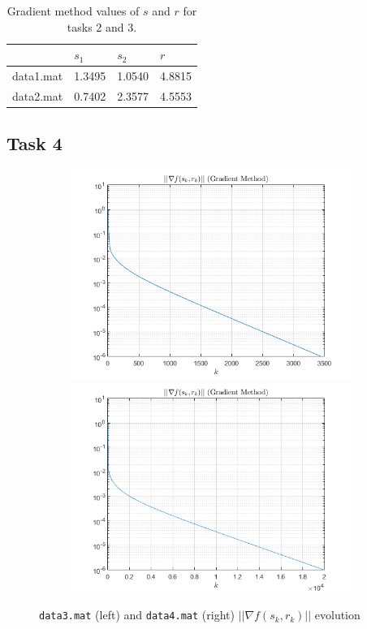 \begin{table}[H]
\centering
\begin{tabular}{l|lll}
 & $s_1$ & $s_2$ & $r$ \\ \hline
data1.mat & 1.3495 & 1.0540 & 4.8815 \\
data2.mat & 0.7402 & 2.3577 & 4.5553
\end{tabular}
\caption{Gradient method values of $s$ and $r$ for tasks 2 and 3.}
\label{table:task3:results}
\end{table}
\subsection{Task 4}
\begin{figure}[H]
    \label{fig:pt2task4:graphs}
    \begin{subfigure}
        \centering
        \includegraphics[width=0.45\linewidth]{part2/figures/T4_Norm_data3.png}\hspace{0em}
        \includegraphics[width=0.45\linewidth]{part2/figures/T4_Norm_data4.png}
    \end{subfigure}
    \caption{\texttt{data3.mat} (left) and \texttt{data4.mat} (right) $||\nabla{f(s_k,r_k)}||$ evolution}
\end{figure}


